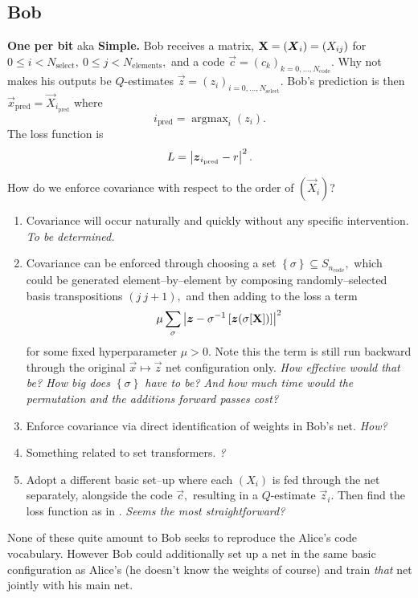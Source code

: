 \documentclass[12pt]{article}
\begin{document}
\subsection{Bob}

{\bf One per bit} aka {\bf Simple.}  Bob receives a matrix, $\mathbf{X} = (\boldsymbol{X}_{i}) = (X_{ij})$ for $0\leq i < N_\text{select},\ 0\leq j < N_\text{elements},$ and a code $\vec{c}=(c_k)_{k=0,...,N_\text{code}}.$  Why not makes his outputs be $Q$-estimates $\vec{z} = (z_i)_{i=0,...,N_\text{select}}.$ Bob's prediction is then
$
	\vec{x}_\text{pred}
=
\vec{X}_{i_\text{pred}}
$
where
\begin{equation}
	i_\text{pred}
	=
	\operatorname{argmax}_{i}  (z_i)
	.
\end{equation}
The loss function is 
\begin{equation}	\label{eq:Bob_loss_fn}
	L
	=
	\left\lvert \boldsymbol{z}_{i_\text{pred}} -r \right\rvert^2
	. 
\end{equation}

How do we enforce covariance with respect to the order of $(\vec{X}_{i})$?
\begin{enumerate}
	\item Covariance will occur naturally and quickly without any specific intervention.  {\em To be determined.}
	\item Covariance can be enforced through choosing a set $\left\lbrace \sigma \right\rbrace \subseteq S_{n_\text{code}},$ which could be generated element--by--element by composing randomly--selected basis transpositions $(j\ j+1),$ and then adding to the loss a term
	\begin{equation}
		\mu\sum_\sigma\left\lvert \boldsymbol{z} - \sigma^{-1}\left[\boldsymbol{z}(\sigma[\mathbf{X}])\right] \right\rvert^2
	\end{equation}
	for some fixed hyperparameter $\mu > 0.$  Note this the term is still run backward through the original $\vec{x}\mapsto\vec{z}$ net configuration only.  {\em How effective would that be?  How big does $\left\lbrace \sigma \right\rbrace$ have to be? And how much time would the permutation and the additions forward passes cost?}
	\item Enforce covariance via direct identification of weights in Bob's net.  {\em How?}
	\item Something related to set transformers. {\em ?}
	\item Adopt a different basic set--up where each $(X_i)$ is fed through the net separately, alongside the code $\vec{c},$ resulting in a $Q$-estimate $\vec{z}_i.$  Then find the loss function as in .  {\em Seems the most straightforward?}
\end{enumerate}
None of these quite amount to Bob seeks to reproduce the Alice's code vocabulary.  However Bob could additionally set up a net in the same basic configuration as Alice's (he doesn't know the weights of course) and train {\em that} net jointly with his main net.
\end{document}
